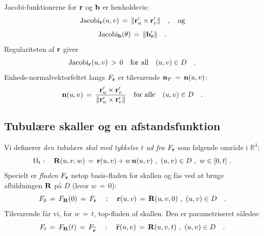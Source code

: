 Jacobi-funktionerne for ${\bf{r}}$ og ${\bf{b}}$
er henholdsvis:
\begin{equation}
\operatorname{Jacobi}_{{\bf{r}}}(u,v) \, = \, \Vert
{\bf{r}}'_{u}\times {\bf{r}}'_{v} \Vert  \quad ,
\quad \textrm{og}
\end{equation}
\begin{equation}
\operatorname{Jacobi}_{{\bf{b}}}(\theta) \, = \,  \Vert
{\bf{b}}'_{\theta} \Vert \quad .
\end{equation}
Regulariteten af  ${\bf{r}}$ giver
$$
\operatorname{Jacobi}_{{\bf{r}}}(u,v)\, > \, 0 \quad \textrm{for
all} \quad (u,v) \in D\quad .
$$
Enheds-normalvektorfeltet langs  $F_{\bf{r}}$ er
tilsvarende ${\bf{n}}_{F}\, = \, {\bf{n}}(u,v)$:
\begin{equation}
{\bf{n}}(u,v) \, = \, \frac{{\bf{r}}'_{u}\times
{\bf{r}}'_{v}}{\Vert {\bf{r}}'_{u}\times
{\bf{r}}'_{v}  \Vert} \quad \textrm{for alle}
\quad (u,v) \in D\quad .
\end{equation}

\subsection{Tubulære skaller og en afstandsfunktion} \label{secShell}

Vi definerer {\em{den {tubulære skal} med tykkelse
$t$ ud fra $F_{\bf{r}}$}} som følgende område i
$\mathbb{R}^{3}$:
\begin{equation} \label{eqOmegaT}
 \Omega_{t}: \quad
{\bf{R}}(u,v,w)\, = \, {\bf{r}}(u,v) +
w\,{\bf{n}}(u,v)  \,\, , \,\, (u,v) \in D \,\, ,
\,\, w \in [0, t] \,\, .
\end{equation}
Specielt er  {\em{fladen}} $F_{\bf{r}}$ netop
basis-fladen for skallen og fås ved at bruge
afbildningen ${\bf{R}}$ på $D$ (hvor $w\, = \,
0$):
\begin{equation}
F_{0}\, = \, F_{\bf{R}}(0) \, = \, F_{\bf{r}} \quad :
\quad {\bf{r}}(u,v) \, = \, {\bf{R}}(u,v,0)\,\,
, \,\, (u,v) \in D \quad.
\end{equation}
Tilsvarende får vi, for $w\,=\,t$, top-fladen
af skallen.
Den er parametriseret således:
\begin{equation}
F_{t}\, = \, F_{\bf{R}}(t) \, = \, F_{\bf{\widehat{r}}} \quad :
\quad {\bf{\widehat{r}}}(u,v) \, = \, {\bf{R}}(u,v,t)\,\,
, \,\, (u,v) \in D \quad.
\end{equation}









